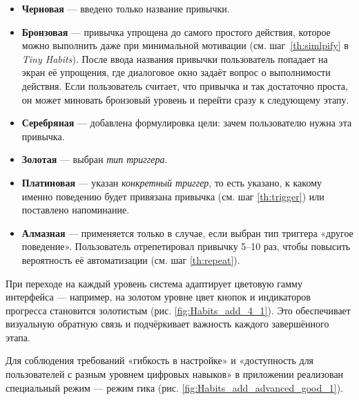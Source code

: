 \documentclass[pdflatex,sn-mathphys-num]{sn-jnl}%
\theoremstyle{thmstyleone}%
\theoremstyle{thmstyletwo}%
\theoremstyle{thmstylethree}%
\begin{document}
\begin{itemize}
    \item \textbf{Черновая} — введено только название привычки.
    \item \textbf{Бронзовая} — привычка упрощена до самого простого действия, которое можно выполнить даже при минимальной мотивации (см. шаг~\ref{th:simlpify} в \textit{Tiny Habits}). После ввода названия привычки пользователь попадает на экран её упрощения, где диалоговое окно задаёт вопрос о выполнимости действия. Если пользователь считает, что привычка и так достаточно проста, он может миновать бронзовый уровень и перейти сразу к следующему этапу.
    \item \textbf{Серебряная} — добавлена формулировка цели: зачем пользователю нужна эта привычка.
    \item \textbf{Золотая} — выбран \textit{тип триггера}.
    \item \textbf{Платиновая} — указан \textit{конкретный триггер}, то есть указано, к какому именно поведению будет привязана привычка (см. шаг \ref{th:trigger}) или поставлено напоминание.
    \item \textbf{Алмазная} — применяется только в случае, если выбран тип триггера «другое поведение». Пользователь отрепетировал привычку 5–10 раз, чтобы повысить вероятность её автоматизации (см. шаг \ref{th:repeat}).
\end{itemize}

При переходе на каждый уровень система адаптирует цветовую гамму интерфейса — например, на золотом уровне цвет кнопок и индикаторов прогресса становится золотистым (рис. \ref{fig:Habits_add_4_1}). Это обеспечивает визуальную обратную связь и подчёркивает важность каждого завершённого этапа.

Для соблюдения требований «гибкость в настройке» и «доступность для пользователей с разным уровнем цифровых навыков» в приложении реализован специальный режим — режим гика (рис. \ref{fig:Habits_add_advanced_good_1}).
\end{document}
